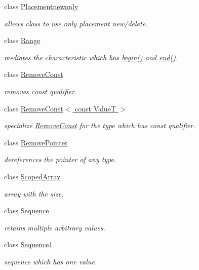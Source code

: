 \begin{DoxyCompactItemize}
class \hyperlink{classhryky_1_1_placementnewonly}{Placementnewonly}
\begin{DoxyCompactList}\small\item\em allows class to use only placement new/delete. \end{DoxyCompactList}\item 
class \hyperlink{classhryky_1_1_range}{Range}
\begin{DoxyCompactList}\small\item\em mediates the characteristic which has \hyperlink{classhryky_1_1_range_aaa45d0481e79fb4d22ec8f048fa23086}{begin()} and \hyperlink{classhryky_1_1_range_a202ec210efd7e9cb9a22b2e98ab21107}{end()}. \end{DoxyCompactList}\item 
class \hyperlink{classhryky_1_1_remove_const}{Remove\-Const}
\begin{DoxyCompactList}\small\item\em removes const qualifier. \end{DoxyCompactList}\item 
class \hyperlink{classhryky_1_1_remove_const_3_01const_01_value_t_01_4}{Remove\-Const$<$ const Value\-T $>$}
\begin{DoxyCompactList}\small\item\em specialize \hyperlink{classhryky_1_1_remove_const}{Remove\-Const} for the type which has const qualifier. \end{DoxyCompactList}\item 
class \hyperlink{classhryky_1_1_remove_pointer}{Remove\-Pointer}
\begin{DoxyCompactList}\small\item\em dereferences the pointer of any type. \end{DoxyCompactList}\item 
class \hyperlink{classhryky_1_1_scoped_array}{Scoped\-Array}
\begin{DoxyCompactList}\small\item\em array with the size. \end{DoxyCompactList}\item 
class \hyperlink{classhryky_1_1_sequence}{Sequence}
\begin{DoxyCompactList}\small\item\em retains multiple arbitrary values. \end{DoxyCompactList}\item 
class \hyperlink{classhryky_1_1_sequence1}{Sequence1}
\begin{DoxyCompactList}\small\item\em sequence which has one value. \end{DoxyCompactList}\item 

\end{DoxyCompactItemize}
